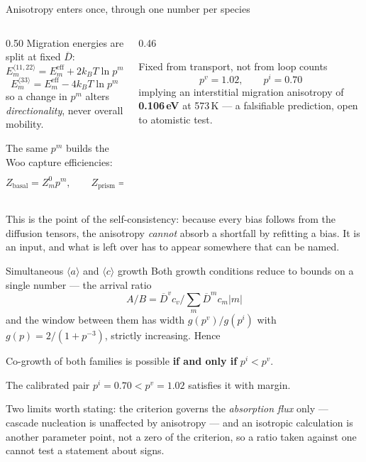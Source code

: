 \documentclass[aspectratio=169,10pt]{beamer}
\newcommand{\aloop}{$\langle a\rangle$}
\newcommand{\cloop}{$\langle c\rangle$}
\newcommand{\foot}[1]{\par\vspace{1ex}%
  \begingroup\footnotesize\raggedright #1\par\endgroup}
\begin{document}
\begin{frame}{Anisotropy enters once, through one number per species}
\begin{columns}[T]
\begin{column}{0.50\textwidth}
\small
Migration energies are split at fixed $\overline D$:
\[
  E_m^{\langle11,22\rangle}=E_m^{\mathrm{eff}}+2k_BT\ln p^{m}
\]
\vspace{-2ex}
\[
  E_m^{\langle33\rangle}=E_m^{\mathrm{eff}}-4k_BT\ln p^{m}
\]
so a change in $p^{m}$ alters \emph{directionality}, never overall mobility.

\vspace{1ex}
The same $p^{m}$ builds the Woo capture efficiencies:
\[
  Z_{\mathrm{basal}}=Z^{0}_mp^{m},\qquad
  Z_{\mathrm{prism}}=Z^{0}_m\frac{p^{m}+p_m^{-2}}{2}
\]
\end{column}
\begin{column}{0.46\textwidth}
\begin{block}{Fixed from transport, not from loop counts}\small
\[
  p^{v}=1.02,\qquad p^{i}=0.70
\]
implying an interstitial migration anisotropy of \textbf{0.106\,eV} at 573\,K
--- a falsifiable prediction, open to atomistic test.
\end{block}
\end{column}
\end{columns}
\foot{This is the point of the self-consistency: because every bias follows
from the diffusion tensors, the anisotropy \emph{cannot} absorb a shortfall by
refitting a bias. It is an input, and what is left over has to appear somewhere
that can be named.}
\end{frame}

\begin{frame}{Simultaneous \aloop{} and \cloop{} growth}
\small
Both growth conditions reduce to bounds on a single number --- the arrival ratio
\[
  A/B=\overline D^{v}c_v\Big/\textstyle\sum_m \overline D^{m}c_m|m|
\]
and the window between them has width $g(p^{v})/g(p^{i})$ with
$g(p)=2/(1+p^{-3})$, strictly increasing. Hence
\begin{block}{}
\centering\normalsize
Co-growth of both families is possible \textbf{if and only if} $p^{i}<p^{v}$.
\end{block}
\vspace{1ex}
The calibrated pair $p^{i}=0.70<p^{v}=1.02$ satisfies it with margin.
\foot{Two limits worth stating: the criterion governs the \emph{absorption flux}
only --- cascade nucleation is unaffected by anisotropy --- and an isotropic
calculation is another parameter point, not a zero of the criterion, so a ratio
taken against one cannot test a statement about signs.}
\end{frame}
\end{document}
